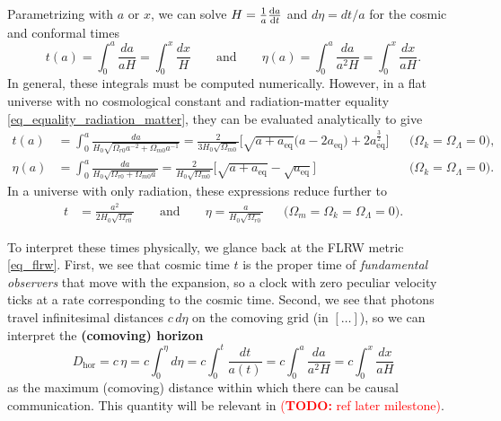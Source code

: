 \documentclass[10pt,a4paper]{article}
\newcommand\TODO[1]{\textcolor{red}{(\textbf{TODO:} #1)}}
\begin{document}
Parametrizing with $a$ or $x$, we can solve $H = \frac1a \odv{a}{t}$ and $d\eta = dt / a$ for the cosmic and conformal times
\begin{equation}
	t(a) = \int_0^a \frac{da}{aH} = \int_0^x \frac{dx}{H}
	\qquad \text{and} \qquad
	\eta(a) = \int_0^a \frac{da}{a^2 H} = \int_0^x \frac{dx}{aH}.
\label{eq_cosmic_conformal_time}
\end{equation}
In general, these integrals must be computed numerically.
However, in a flat universe with no cosmological constant and radiation-matter equality \eqref{eq_equality_radiation_matter},
they can be evaluated analytically to give
\begin{subequations}
\begin{align}
	t(a) &= \int_0^a \frac{da}{H_0 \sqrt{\Omega_{r0}a^{-2} + \Omega_{m0}a^{-1}}}
	      = \frac{2}{3 H_0 \sqrt{\Omega_{m0}}} \Big[\sqrt{a + a_\text{eq}} \big(a - 2 a_\text{eq}\big) + 2 a_\text{eq}^\frac32 \Big] && \Big(\Omega_k=\Omega_\Lambda=0\Big)
	\label{eq_cosmic_time_anal}, \\
	\eta(a) &= \int_0^a \frac{da}{H_0 \sqrt{\Omega_{r0} + \Omega_{m0} a}}
		     = \frac{2}{H_0 \sqrt{\Omega_{m0}}} \Big[ \sqrt{a + a_\text{eq}} - \sqrt{a_\text{eq}}\Big] && \Big(\Omega_k=\Omega_\Lambda=0\Big)
	\label{eq_conformal_time_anal}.
\end{align}
\label{eq_cosmic_conformal_time_anal}
\end{subequations}
In a universe with only radiation, these expressions reduce further to
\begin{align}
	t &= \frac{a^2}{2 H_0 \sqrt{\Omega_{r0}}}
	\qquad \text{and} \qquad
	\eta = \frac{a}{H_0 \sqrt{\Omega_{r0}}}
	&& \Big(\Omega_m=\Omega_k=\Omega_\Lambda=0\Big).
\label{eq_cosmic_conformal_time_anal_radiation}
\end{align}

To interpret these times physically, we glance back at the FLRW metric \eqref{eq_flrw}.
First, we see that cosmic time $t$ is the proper time of \emph{fundamental observers} that move with the expansion,
so a clock with zero peculiar velocity ticks at a rate corresponding to the cosmic time.
Second, we see that photons travel infinitesimal distances $c\,d\eta$ on the comoving grid (in $[\ldots]$),
so we can interpret the \textbf{(comoving) horizon}
\begin{equation}
D_\text{hor} = c \, \eta = c \int_0^\eta d\eta = c \int_0^t \frac{dt}{a(t)} = c \int_0^a \frac{da}{a^2 H} = c \int_0^x \frac{dx}{aH}
\label{eq_horizon}
\end{equation}
as the maximum (comoving) distance within which there can be causal communication.
This quantity will be relevant in \TODO{ref later milestone}.
\end{document}
